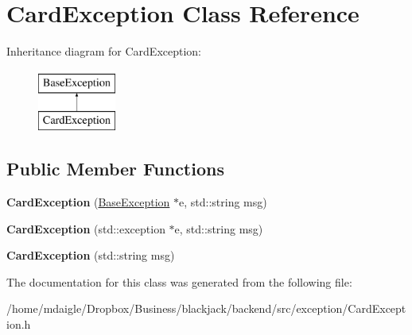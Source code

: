 \hypertarget{classCardException}{
\section{\-Card\-Exception \-Class \-Reference}
\label{classCardException}
}
\-Inheritance diagram for \-Card\-Exception\-:\begin{figure}[H]
\begin{center}
\leavevmode
\includegraphics[height=2.000000cm]{classCardException}
\end{center}
\end{figure}
\subsection*{\-Public \-Member \-Functions}
\begin{DoxyCompactItemize}
\item 
\hypertarget{classCardException_a3e28f7ba8484a2da4562d6ee4a877b00}{
{\bfseries \-Card\-Exception} (\hyperlink{classBaseException}{\-Base\-Exception} $\ast$e, std\-::string msg)}
\label{classCardException_a3e28f7ba8484a2da4562d6ee4a877b00}

\item 
\hypertarget{classCardException_a7e7cf55fdd0d0bff3d5075d74bb97d0f}{
{\bfseries \-Card\-Exception} (std\-::exception $\ast$e, std\-::string msg)}
\label{classCardException_a7e7cf55fdd0d0bff3d5075d74bb97d0f}

\item 
\hypertarget{classCardException_a055c192dae1bf039f181ec91a9d3909f}{
{\bfseries \-Card\-Exception} (std\-::string msg)}
\label{classCardException_a055c192dae1bf039f181ec91a9d3909f}

\end{DoxyCompactItemize}


\-The documentation for this class was generated from the following file\-:\begin{DoxyCompactItemize}
\item 
/home/mdaigle/\-Dropbox/\-Business/blackjack/backend/src/exception/\-Card\-Exception.\-h\end{DoxyCompactItemize}
